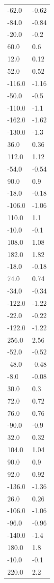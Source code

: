 \begin{longtable}{ll}
-62.0 & -0.62 \\
-84.0 & -0.84 \\
-20.0 & -0.2 \\
60.0 & 0.6 \\
12.0 & 0.12 \\
52.0 & 0.52 \\
-116.0 & -1.16 \\
-50.0 & -0.5 \\
-110.0 & -1.1 \\
-162.0 & -1.62 \\
-130.0 & -1.3 \\
36.0 & 0.36 \\
112.0 & 1.12 \\
-54.0 & -0.54 \\
90.0 & 0.9 \\
-18.0 & -0.18 \\
-106.0 & -1.06 \\
110.0 & 1.1 \\
-10.0 & -0.1 \\
108.0 & 1.08 \\
182.0 & 1.82 \\
-18.0 & -0.18 \\
74.0 & 0.74 \\
-34.0 & -0.34 \\
-122.0 & -1.22 \\
-22.0 & -0.22 \\
-122.0 & -1.22 \\
256.0 & 2.56 \\
-52.0 & -0.52 \\
-48.0 & -0.48 \\
-8.0 & -0.08 \\
30.0 & 0.3 \\
72.0 & 0.72 \\
76.0 & 0.76 \\
-90.0 & -0.9 \\
32.0 & 0.32 \\
104.0 & 1.04 \\
90.0 & 0.9 \\
92.0 & 0.92 \\
-136.0 & -1.36 \\
26.0 & 0.26 \\
-106.0 & -1.06 \\
-96.0 & -0.96 \\
-140.0 & -1.4 \\
180.0 & 1.8 \\
-10.0 & -0.1 \\
220.0 & 2.2 \\

\end{longtable}
